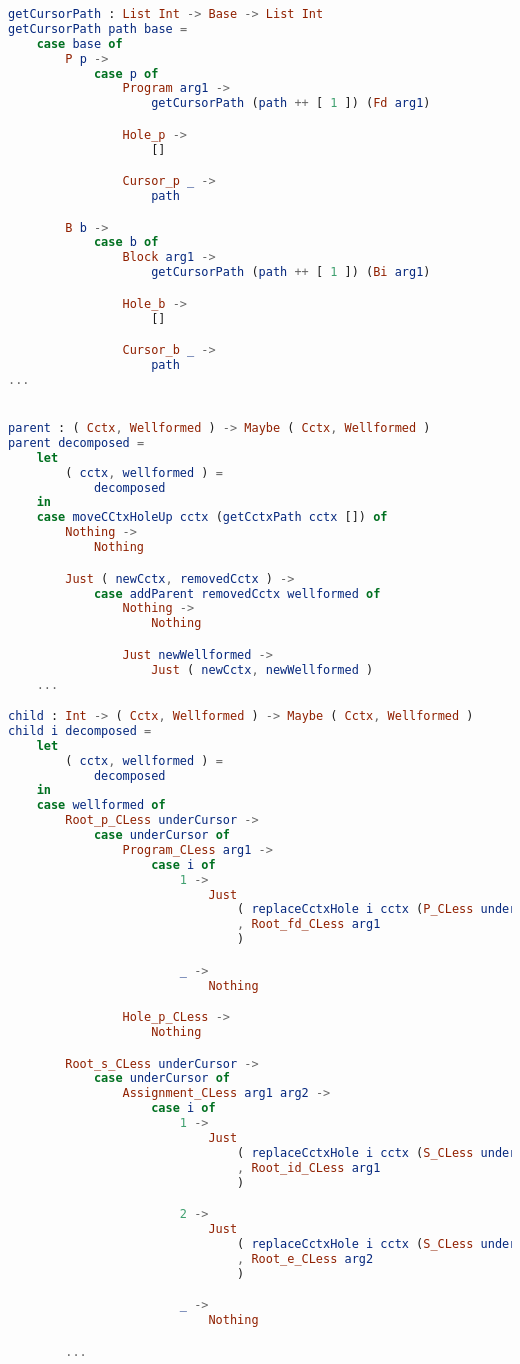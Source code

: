 \begin{lstlisting}[style=inline, language=elm, caption={Generated functions for cursor movement for the C language}, label={lst:c-movement}]
getCursorPath : List Int -> Base -> List Int
getCursorPath path base =
    case base of
        P p ->
            case p of
                Program arg1 ->
                    getCursorPath (path ++ [ 1 ]) (Fd arg1)

                Hole_p ->
                    []

                Cursor_p _ ->
                    path

        B b ->
            case b of
                Block arg1 ->
                    getCursorPath (path ++ [ 1 ]) (Bi arg1)

                Hole_b ->
                    []

                Cursor_b _ ->
                    path
...


parent : ( Cctx, Wellformed ) -> Maybe ( Cctx, Wellformed )
parent decomposed =
    let
        ( cctx, wellformed ) =
            decomposed
    in
    case moveCCtxHoleUp cctx (getCctxPath cctx []) of
        Nothing ->
            Nothing

        Just ( newCctx, removedCctx ) ->
            case addParent removedCctx wellformed of
                Nothing ->
                    Nothing

                Just newWellformed ->
                    Just ( newCctx, newWellformed )
    ...

child : Int -> ( Cctx, Wellformed ) -> Maybe ( Cctx, Wellformed )
child i decomposed =
    let
        ( cctx, wellformed ) =
            decomposed
    in
    case wellformed of
        Root_p_CLess underCursor ->
            case underCursor of
                Program_CLess arg1 ->
                    case i of
                        1 ->
                            Just
                                ( replaceCctxHole i cctx (P_CLess underCursor)
                                , Root_fd_CLess arg1
                                )

                        _ ->
                            Nothing

                Hole_p_CLess ->
                    Nothing

        Root_s_CLess underCursor ->
            case underCursor of
                Assignment_CLess arg1 arg2 ->
                    case i of
                        1 ->
                            Just
                                ( replaceCctxHole i cctx (S_CLess underCursor)
                                , Root_id_CLess arg1
                                )

                        2 ->
                            Just
                                ( replaceCctxHole i cctx (S_CLess underCursor)
                                , Root_e_CLess arg2
                                )

                        _ ->
                            Nothing

        ...
\end{lstlisting}

